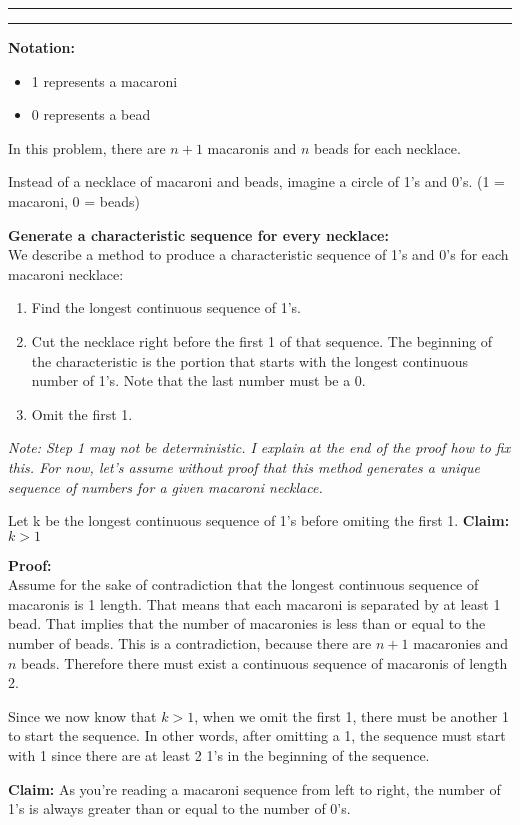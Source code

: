 \documentclass[11pt]{article}
\newcounter{questionCounter}
\newcounter{partCounter}[questionCounter]
\newenvironment{question}[2][\arabic{questionCounter}]{%
    \setcounter{partCounter}{0}%
    \vspace{.25in} \hrule \vspace{0.5em}%
        \noindent{\bf #2}%
    \vspace{0.8em} \hrule \vspace{.10in}%
    \addtocounter{questionCounter}{1}%
}{}
\begin{document}
\begin{question}{Macaroni Revisited}
\textbf{Notation:}\\
\begin{itemize}
\item 1 represents a macaroni
\item 0 represents a bead
\end{itemize}
In this problem, there are $n+1$ macaronis and $n$ beads for each necklace.

Instead of a necklace of macaroni and beads, imagine a circle of 1's and 0's. 
(1 = macaroni, 0 = beads)

\textbf{Generate a characteristic sequence for every necklace:}\\

We describe a method to produce a characteristic sequence of 1's and 0's for 
each macaroni necklace:
\begin{enumerate}
\item Find the longest continuous sequence of 1's.
\item Cut the necklace right before the first 1 of that sequence. The beginning
of the characteristic is the portion that starts with the longest continuous number
of 1's. Note that the last number must be a 0.
\item Omit the first 1.
\end{enumerate}
\emph{Note: Step 1 may not be deterministic. I explain at the end of the proof how 
to fix this. For now, let's assume without proof that this method generates a 
unique sequence of numbers for a given macaroni necklace.}

Let k be the longest continuous sequence of 1's before omiting the first 1.
\textbf{Claim:} $k > 1$

\textbf{Proof:}\\
Assume for the sake of contradiction that the longest continuous sequence of macaronis
is 1 length. That means that each macaroni is separated by at least 1 bead.
That implies that the number of macaronies is less than or equal to the number of 
beads. This is a contradiction, because there are $n+1$ macaronies and $n$ beads.
Therefore there must exist a continuous sequence of macaronis of length 2.

Since we now know that $k>1$, when we omit the first 1, there must be another 1
to start the sequence. In other words, after omitting a 1, the sequence must start 
with 1 since there are at least 2 1's in the beginning of the sequence.

\textbf{Claim:} As you're reading a macaroni sequence from left to right,
 the number of 1's is always greater than or equal to the number of 0's.
 

\end{question}
\end{document}
